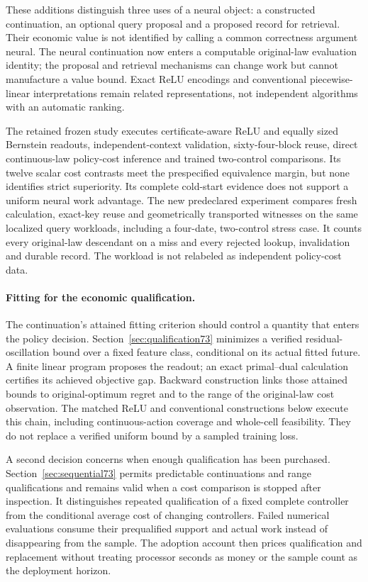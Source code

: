 \documentclass[ecta,nameyear,draft]{econsocart}
\begin{document}
These additions distinguish three uses of a neural object: a constructed continuation, an optional query proposal and a proposed record for retrieval. Their economic value is not identified by calling a common correctness argument neural. The neural continuation now enters a computable original-law evaluation identity; the proposal and retrieval mechanisms can change work but cannot manufacture a value bound. Exact ReLU encodings and conventional piecewise-linear interpretations remain related representations, not independent algorithms with an automatic ranking.

The retained frozen study executes certificate-aware ReLU and equally sized Bernstein readouts, independent-context validation, sixty-four-block reuse, direct continuous-law policy-cost inference and trained two-control comparisons. Its twelve scalar cost contrasts meet the prespecified equivalence margin, but none identifies strict superiority. Its complete cold-start evidence does not support a uniform neural work advantage. The new predeclared experiment compares fresh calculation, exact-key reuse and geometrically transported witnesses on the same localized query workloads, including a four-date, two-control stress case. It counts every original-law descendant on a miss and every rejected lookup, invalidation and durable record. The workload is not relabeled as independent policy-cost data.

\paragraph{Fitting for the economic qualification.}
The continuation's attained fitting criterion should control a quantity that enters the policy decision. Section~\ref{sec:qualification73} minimizes a verified residual-oscillation bound over a fixed feature class, conditional on its actual fitted future. A finite linear program proposes the readout; an exact primal--dual calculation certifies its achieved objective gap. Backward construction links those attained bounds to original-optimum regret and to the range of the original-law cost observation. The matched ReLU and conventional constructions below execute this chain, including continuous-action coverage and whole-cell feasibility. They do not replace a verified uniform bound by a sampled training loss.

A second decision concerns when enough qualification has been purchased. Section~\ref{sec:sequential73} permits predictable continuations and range qualifications and remains valid when a cost comparison is stopped after inspection. It distinguishes repeated qualification of a fixed complete controller from the conditional average cost of changing controllers. Failed numerical evaluations consume their prequalified support and actual work instead of disappearing from the sample. The adoption account then prices qualification and replacement without treating processor seconds as money or the sample count as the deployment horizon.
\end{document}

